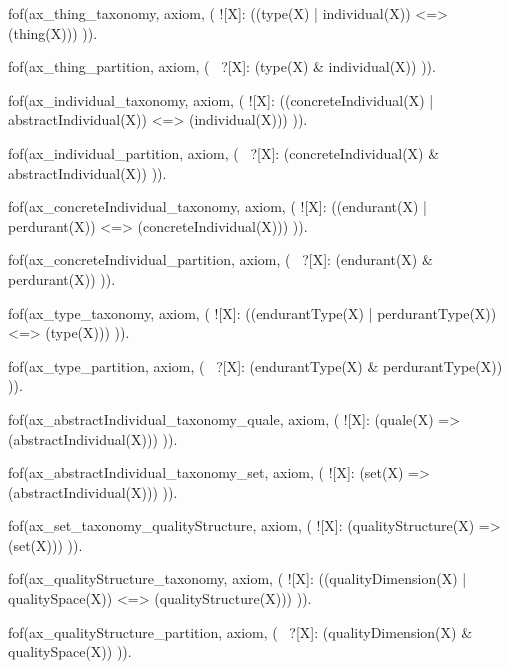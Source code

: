 


fof(ax_thing_taxonomy, axiom, (
  ![X]: ((type(X) | individual(X)) <=> (thing(X)))
)).

fof(ax_thing_partition, axiom, (
  ~?[X]: (type(X) & individual(X))
)).


fof(ax_individual_taxonomy, axiom, (
  ![X]: ((concreteIndividual(X) | abstractIndividual(X)) <=> (individual(X)))
)).

fof(ax_individual_partition, axiom, (
  ~?[X]: (concreteIndividual(X) & abstractIndividual(X))
)).


fof(ax_concreteIndividual_taxonomy, axiom, (
  ![X]: ((endurant(X) | perdurant(X)) <=> (concreteIndividual(X)))
)).

fof(ax_concreteIndividual_partition, axiom, (
  ~?[X]: (endurant(X) & perdurant(X))
)).


fof(ax_type_taxonomy, axiom, (
  ![X]: ((endurantType(X) | perdurantType(X)) <=> (type(X)))
)).

fof(ax_type_partition, axiom, (
  ~?[X]: (endurantType(X) & perdurantType(X))
)).




fof(ax_abstractIndividual_taxonomy_quale, axiom, (
  ![X]: (quale(X) => (abstractIndividual(X)))
)).

fof(ax_abstractIndividual_taxonomy_set, axiom, (
  ![X]: (set(X) => (abstractIndividual(X)))
)).


fof(ax_set_taxonomy_qualityStructure, axiom, (
  ![X]: (qualityStructure(X) => (set(X)))
)).


fof(ax_qualityStructure_taxonomy, axiom, (
  ![X]: ((qualityDimension(X) | qualitySpace(X)) <=> (qualityStructure(X)))
)).

fof(ax_qualityStructure_partition, axiom, (
  ~?[X]: (qualityDimension(X) & qualitySpace(X))
)).

